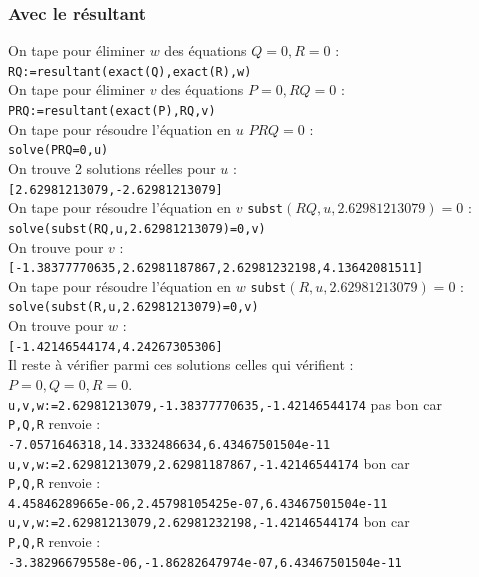\documentclass[a4paper,11pt]{book}
\begin{document}
\subsubsection{Avec le r\'esultant}
On tape pour \'eliminer $w$ des \'equations $Q=0,R=0$ :\\
{\tt RQ:=resultant(exact(Q),exact(R),w)}\\
On tape pour \'eliminer $v$ des \'equations $P=0,RQ=0$ :\\
{\tt PRQ:=resultant(exact(P),RQ,v)}\\
On tape pour r\'esoudre l'\'equation en $u$  $PRQ=0$ :\\
{\tt solve(PRQ=0,u)}\\
On trouve 2 solutions r\'eelles pour $u$ :\\
{\tt [2.62981213079,-2.62981213079]}\\
On tape pour r\'esoudre l'\'equation en $v$  
{\tt subst}$(RQ,u,2.62981213079)=0$ :\\
{\tt solve(subst(RQ,u,2.62981213079)=0,v)}\\
On trouve pour $v$ :\\
{\tt [-1.38377770635,2.62981187867,2.62981232198,4.13642081511]}\\
On tape pour r\'esoudre l'\'equation en $w$  {\tt subst}$(R,u,2.62981213079)=0$ :\\
{\tt solve(subst(R,u,2.62981213079)=0,v)}\\
On trouve pour $w$ :\\
{\tt [-1.42146544174,4.24267305306]}\\
Il reste \`a v\'erifier parmi ces solutions celles qui v\'erifient :\\ 
$P=0,Q=0,R=0$.\\
{\tt u,v,w:=2.62981213079,-1.38377770635,-1.42146544174} pas bon car\\
{\tt P,Q,R} renvoie :\\
{\tt -7.0571646318,14.3332486634,6.43467501504e-11}\\

{\tt u,v,w:=2.62981213079,2.62981187867,-1.42146544174}  bon car\\
{\tt P,Q,R} renvoie :\\
{\tt 4.45846289665e-06,2.45798105425e-07,6.43467501504e-11}\\

{\tt u,v,w:=2.62981213079,2.62981232198,-1.42146544174} bon car\\
{\tt P,Q,R} renvoie :\\
{\tt -3.38296679558e-06,-1.86282647974e-07,6.43467501504e-11}\\
\end{document}
